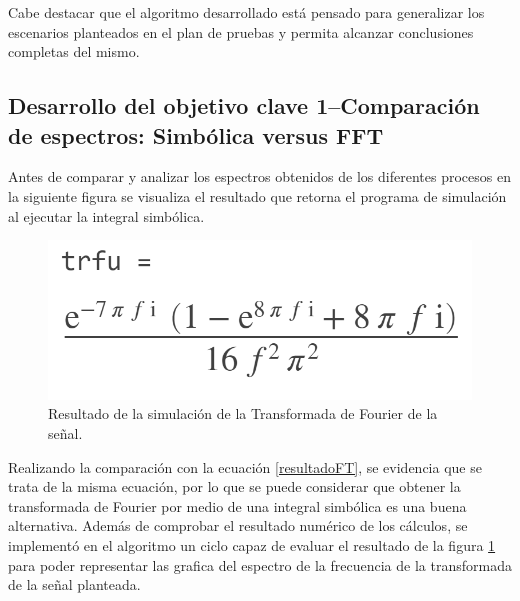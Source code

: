 \documentclass[11pt,letterpaper,twocolumn]{article}
\begin{document}
    Cabe destacar que el algoritmo desarrollado está pensado para generalizar los escenarios planteados 
    en el plan de pruebas y permita alcanzar conclusiones completas del mismo.
    
    \subsection{Desarrollo del objetivo clave 1--Comparación de espectros: Simbólica versus FFT}
        Antes de comparar y analizar los espectros obtenidos de los diferentes procesos en la siguiente figura 
        se visualiza el resultado que retorna el programa de simulación al ejecutar la integral simbólica.
        
        \begin{figure}[H]
            \centering 
            \centering
            \includegraphics[width=0.5\linewidth]{img/ResultadoEcuacionMATLAB.png}
            \caption{Resultado de la simulación de la Transformada de Fourier de la señal.}
            \label{resultadoEcuacionMATLAB}
        \end{figure} 
        
        Realizando la comparación con la ecuación \ref{resultadoFT}, se evidencia que se trata de 
        la misma ecuación, por lo que se puede considerar que obtener la transformada de Fourier
        por medio de una integral simbólica es una buena alternativa. Además de comprobar el resultado
        numérico de los cálculos, se implementó en el algoritmo un ciclo capaz de evaluar el resultado
        de la figura \ref{resultadoEcuacionMATLAB} para poder representar las grafica del espectro de la
        frecuencia de la transformada de la señal planteada.
         
\end{document}
